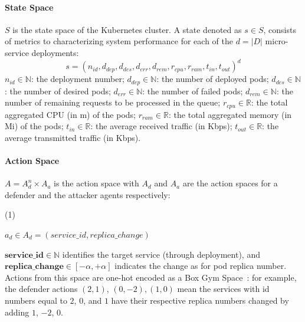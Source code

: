 \noindent \paragraph{\textbf{State Space}} $S$ is the state space of the Kubernetes cluster. A state denoted as $s \in S$, consists of metrics to characterizing system performance for each of the $d = |D|$ micro-service deployments:
$$
  s = (n_{id}, d_{dep}, d_{des}, d_{err}, d_{rem}, r_{cpu}, r_{ram}, t_{in}, t_{out})^d
$$
$n_{id} \in \mathbb{N}$: the deployment number; \quad
$d_{dep} \in \mathbb{N}$: the number of deployed pods; \quad
$d_{des} \in \mathbb{N}$: the number of desired pods; \quad
$d_{err} \in \mathbb{N}$: the number of failed pods; \quad
$d_{rem} \in \mathbb{N}$: the number of remaining requests to be processed in the queue; \quad
$r_{cpu} \in \mathbb{R}$: the total aggregated CPU (in m) of the pods; \quad
$r_{ram} \in \mathbb{R}$: the total aggregated memory (in Mi) of the pods; \quad
$t_{in} \in \mathbb{R}$: the average received traffic (in Kbps); \quad
$t_{out} \in \mathbb{R}$: the average transmitted traffic (in Kbps).


\noindent \paragraph{\textbf{Action Space}} $A = A_d^n \times A_a$ is the action space with $A_d$ and $A_a$ are the action spaces for a defender and the attacker agents respectively:

\vspace{0.3cm}

\indent\begin{minipage}{0.15\linewidth}
  (1)
\end{minipage}
\begin{minipage}{0.9\linewidth}
  \raggedright
  $\displaystyle a_d \in A_d = (service\_id, replica\_change)$
\end{minipage}

\vspace{0.3cm}

\indent $\mathbf{service\_id} \in \mathbb{N}$ identifies the target service (through deployment), and $\mathbf{replica\_change} \in [-\alpha, +\alpha]$ indicates the change as for pod replica number. Actions from this space are one-hot encoded as a Box Gym Space~\cite{openAIGymActionSpaces}: for example, the defender actions $(2,1)$, $(0,-2), (1,0)$ mean the services with id numbers equal to $2$, $0$, and $1$ have their respective replica numbers changed by adding $1$, $-2$, $0$.

